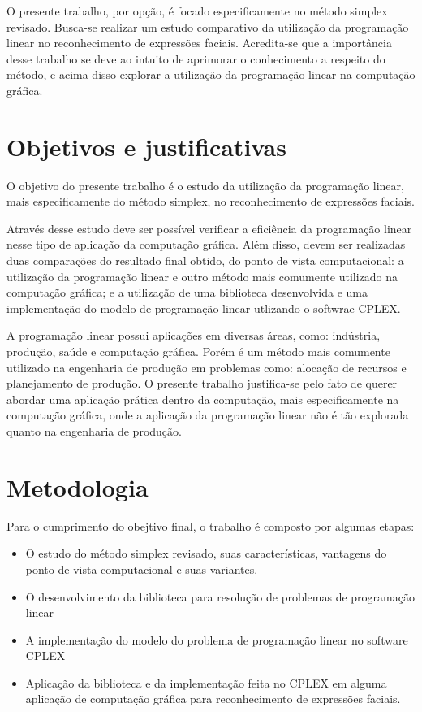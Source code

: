 O presente trabalho, por opção, é focado especificamente no método simplex revisado. Busca-se realizar um estudo comparativo da utilização da programação linear no reconhecimento de expressões faciais. Acredita-se que a importância desse trabalho se deve ao intuito de aprimorar o conhecimento a respeito do método, e acima disso explorar a utilização da programação linear na computação gráfica.

\section{Objetivos e justificativas}
O objetivo do presente trabalho é o estudo da utilização da programação linear, mais especificamente do método simplex, no reconhecimento de expressões faciais. 

Através desse estudo deve ser possível verificar a eficiência da programação linear nesse tipo de aplicação da computação gráfica. Além disso, devem ser realizadas duas comparações do resultado final obtido, do ponto de vista computacional: a utilização da programação linear e outro método mais comumente utilizado na computação gráfica; e a utilização de uma biblioteca desenvolvida e uma implementação do modelo de programação linear utlizando o softwrae CPLEX.

A programação linear possui aplicações em diversas áreas, como: indústria, produção, saúde e computação gráfica. Porém é um método mais comumente utilizado na engenharia de produção em problemas como: alocação de recursos e planejamento de produção. O presente trabalho justifica-se pelo fato de querer abordar uma aplicação prática dentro da computação, mais especificamente na computação gráfica, onde a aplicação da programação linear não é tão explorada quanto na engenharia de produção.

\section{Metodologia}
Para o cumprimento do obejtivo final, o trabalho é composto por algumas etapas:

\begin{itemize} 
\item O estudo do método simplex revisado, suas características, vantagens do ponto de vista computacional e suas variantes.
\item O desenvolvimento da biblioteca para resolução de problemas de programação linear
\item A implementação do modelo do problema de programação linear no software CPLEX
\item Aplicação da biblioteca e da implementação feita no CPLEX em alguma aplicação de computação gráfica para reconhecimento de expressões faciais.
\end{itemize}


